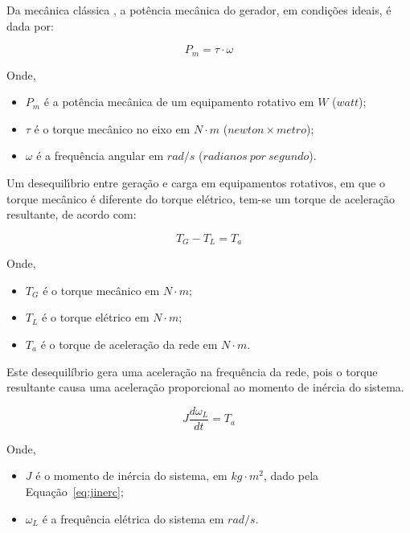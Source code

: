 Da mec{\^a}nica cl{\'a}ssica \cite{umans2013fitzgerald}, a pot{\^e}ncia mec{\^a}nica do gerador, em condi{\c c}{\~o}es ideais, {\'e} dada por:

\begin{equation}
	\label{eq:ptom}
	P_{m} = \tau \cdot \omega
\end{equation}

Onde,

\begin{itemize}
	\item[] $P_{m}$ {\'e} a pot{\^e}ncia mec{\^a}nica de um equipamento rotativo em $W$ ($watt$);
	\item[] $\tau$ {\'e} o torque mec{\^a}nico no eixo em $N\cdot m$ ($newton \times metro$);
	\item[] $\omega$ {\'e} a frequ{\^e}ncia angular em $rad/s$ ($radianos~por~segundo$).
\end{itemize}

Um desequil{\'\i}brio entre gera{\c c}{\~a}o e carga em equipamentos rotativos, em que o torque mec{\^a}nico {\'e} diferente do torque el{\'e}trico, tem-se um torque de acelera{\c c}{\~a}o resultante, de acordo com:

\begin{equation}
	\label{eq:torq}
	T_{G} - T_{L} = T_{a}
\end{equation}

Onde,

\begin{itemize}
	\item[] $T_{G}$ {\'e} o torque mec{\^a}nico em $N \cdot m$;
	\item[] $T_{L}$ {\'e} o torque el{\'e}trico em $N \cdot m$;
	\item[] $T_{a}$ {\'e} o torque de acelera{\c c}{\~a}o da rede em $N \cdot m$.
\end{itemize}

Este desequil{\'i}brio gera uma acelera{\c c}{\~a}o na frequ{\^e}ncia da rede, pois o torque resultante causa uma acelera{\c c}{\~a}o proporcional ao momento de in{\'e}rcia do sistema.

\begin{equation}
	\label{eq:acel}
	J\frac{d\omega_{L}}{dt} = T_{a}
\end{equation}

Onde,

\begin{itemize}
	\item[] $J$ {\'e} o momento de in{\'e}rcia do sistema, em $kg \cdot m^{2}$, dado pela Equa{\c c}{\~a}o~\ref{eq:jinerc};
	\item[] $\omega_{L}$ {\'e} a frequ{\^e}ncia el{\'e}trica do sistema em $rad/s$.
\end{itemize}

